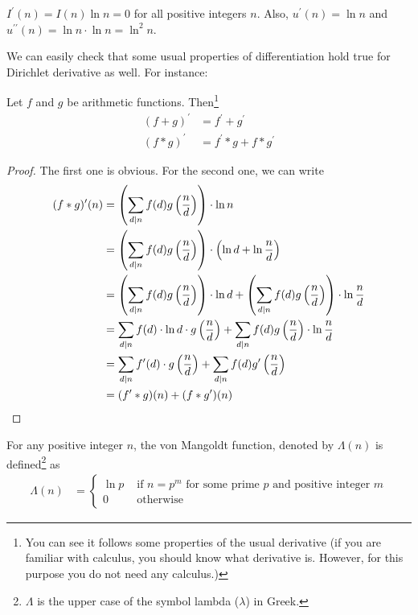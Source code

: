 \begin{example}
	$I^\prime(n)=I(n)\ln n=0$ for all positive integers $n$. Also, $u^\prime(n)=\ln n$ and $u^{\prime\prime}(n)=\ln n\cdot\ln n=\ln^2 n$.
\end{example}
We can easily check that some usual properties of differentiation hold true for Dirichlet derivative as well. For instance:
\begin{proposition}
	Let $f$ and $g$ be arithmetic functions. Then\footnote{You can see it follows some properties of the usual derivative (if you are familiar with calculus, you should know what derivative is. However, for this purpose you do not need any calculus.)}
		\begin{align*}
			(f+g)^\prime & =f^\prime+g^\prime\\
			(f\ast g)^\prime& =f^\prime \ast g + f\ast g^\prime
		\end{align*}
\end{proposition}
\begin{proof}
	The first one is obvious. For the second one, we can write
		\begin{align*}
			(f\ast g)^\prime (n)
				&= \left(\sum_{d\mid n} f(d)g\left(\dfrac{n}{d}\right)\right) \cdot \ln n\\
				&= \left(\sum_{d\mid n} f(d)g\left(\dfrac{n}{d}\right)\right) \cdot \left(\ln d + \ln \dfrac{n}{d}\right)\\
				&= \left(\sum_{d\mid n} f(d)g\left(\dfrac{n}{d}\right)\right) \cdot \ln d +\left(\sum_{d\mid n} f(d)g\left(\dfrac{n}{d}\right)\right) \cdot \ln \dfrac{n}{d}\\
				&= \sum_{d\mid n} f(d)\cdot \ln d \cdot g\left(\dfrac{n}{d}\right)+ \sum_{d\mid n} f(d)g\left(\dfrac{n}{d}\right) \cdot \ln \dfrac{n}{d}\\
				&= \sum_{d\mid n} f^\prime(d) \cdot g\left(\dfrac{n}{d}\right)+ \sum_{d\mid n} f(d) g'\left(\dfrac{n}{d}\right)\\
				&= (f^\prime \ast g)(n) + (f\ast g^\prime)(n)
		\end{align*}

\end{proof}

\begin{definition}
	For any positive integer $n$, the von Mangoldt function, denoted by $\Lambda(n)$ is defined\footnote{$\Lambda$ is the upper case of the symbol lambda ($\lambda$) in Greek.} as
		\begin{align*}
			\Lambda(n) & =
				\begin{cases}\ln p &\mbox{ if }n=p^m\mbox{ for  some prime }p\mbox{ and positive integer }m\\0&\mbox{ otherwise}\end{cases}
		\end{align*}
\end{definition}


